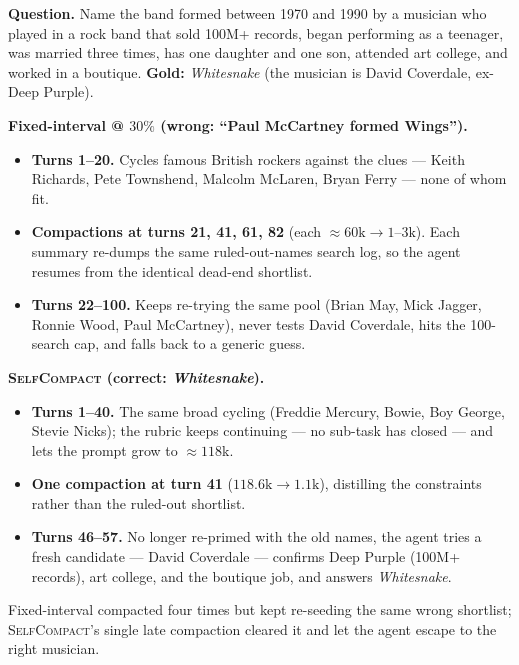 \documentclass{article}
\newcommand{\method}{\textsc{{SelfCompact}}}
\begin{document}
\begin{casebox}[title={Case~A: Whitesnake --- fixed-interval stays anchored, \method{} breaks out}]
\textbf{Question.} Name the band formed between 1970 and 1990 by a musician
who played in a rock band that sold 100M+ records, began performing as a
teenager, was married three times, has one daughter and one son, attended art
college, and worked in a boutique. \textbf{Gold:} \emph{Whitesnake} (the
musician is David Coverdale, ex-Deep Purple).
 
\textbf{Fixed-interval @ $30\%$ (wrong: ``Paul McCartney formed Wings'').}
\begin{itemize}[leftmargin=*]\setlength\itemsep{1pt}
\item \textbf{Turns 1--20.} Cycles famous British rockers against the clues ---
Keith Richards, Pete Townshend, Malcolm McLaren, Bryan Ferry --- none of whom fit.
\item \textbf{Compactions at turns 21, 41, 61, 82} (each ${\approx}60\mathrm{k}\to1$--$3\mathrm{k}$).
Each summary re-dumps the same ruled-out-names search log, so the agent
resumes from the identical dead-end shortlist.
\item \textbf{Turns 22--100.} Keeps re-trying the same pool (Brian May, Mick
Jagger, Ronnie Wood, Paul McCartney), never tests David Coverdale, hits the
100-search cap, and falls back to a generic guess.
\end{itemize}
\textbf{\method{} (correct: \emph{Whitesnake}).}
\begin{itemize}[leftmargin=*]\setlength\itemsep{1pt}
\item \textbf{Turns 1--40.} The same broad cycling (Freddie Mercury, Bowie,
Boy George, Stevie Nicks); the rubric keeps continuing --- no sub-task has
closed --- and lets the prompt grow to ${\approx}118$k.
\item \textbf{One compaction at turn 41} ($118.6\mathrm{k}\to1.1\mathrm{k}$),
distilling the constraints rather than the ruled-out shortlist.
\item \textbf{Turns 46--57.} No longer re-primed with the old names, the agent
tries a fresh candidate --- David Coverdale --- confirms Deep Purple (100M+
records), art college, and the boutique job, and answers \emph{Whitesnake}.
\end{itemize}
Fixed-interval compacted four times but kept re-seeding the same wrong shortlist;
\method{}'s single late compaction cleared it and let the agent escape to the
right musician.
\end{casebox}
\end{document}

